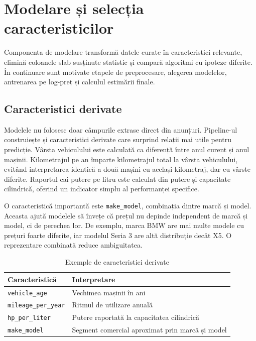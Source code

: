 \section{Modelare și selecția caracteristicilor}
\label{sec:implementation-models}

Componenta de modelare transformă datele curate în caracteristici relevante, elimină coloanele slab susținute statistic și compară algoritmi cu ipoteze diferite. În continuare sunt motivate etapele de preprocesare, alegerea modelelor, antrenarea pe log-preț și calculul estimării finale.

\subsection{Caracteristici derivate}
\label{sec:models-features}

Modelele nu folosesc doar câmpurile extrase direct din anunțuri. Pipeline-ul construiește și caracteristici derivate care surprind relații mai utile pentru predicție. Vârsta vehiculului este calculată ca diferență între anul curent și anul mașinii. Kilometrajul pe an împarte kilometrajul total la vârsta vehiculului, evitând interpretarea identică a două mașini cu același kilometraj, dar cu vârste diferite. Raportul cai putere pe litru este calculat din putere și capacitate cilindrică, oferind un indicator simplu al performanței specifice.

O caracteristică importantă este \texttt{make\_model}, combinația dintre marcă și model. Aceasta ajută modelele să învețe că prețul nu depinde independent de marcă și model, ci de perechea lor. De exemplu, marca BMW are mai multe modele cu prețuri foarte diferite, iar modelul Seria 3 are altă distribuție decât X5. O reprezentare combinată reduce ambiguitatea.

\begin{table}[htb]
    \centering
    \caption{Exemple de caracteristici derivate}
    \label{tab:derived-features}
    \begin{tabular}{lp{8cm}}
        \toprule
        Caracteristică & Interpretare \\
        \midrule
        \texttt{vehicle\_age} & Vechimea mașinii în ani \\
        \texttt{mileage\_per\_year} & Ritmul de utilizare anuală \\
        \texttt{hp\_per\_liter} & Putere raportată la capacitatea cilindrică \\
        \texttt{make\_model} & Segment comercial aproximat prin marcă și model \\
        \bottomrule
    \end{tabular}
\end{table}

